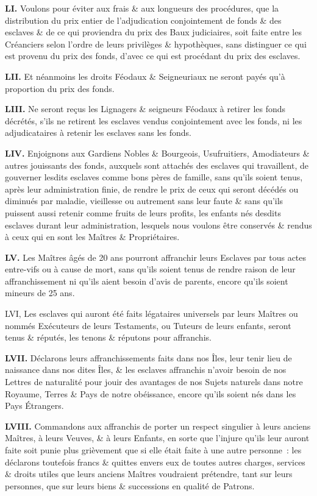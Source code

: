\documentclass[french,twoside]{book} %
\newcommand{\labelchar}[1]{\textbf{\color{rubric} #1}}
\begin{document}
\labelchar{LI.} Voulons pour éviter aux frais \& aux longueurs des procédures, que la distribution du prix entier de l’adjudication conjointement de fonds \& des esclaves \& de ce qui proviendra du prix des Baux judiciaires, soit faite entre les Créanciers selon l’ordre de leurs privilèges \& hypothèques, sans distinguer ce qui est provenu du prix des fonds, d’avec ce qui est procédant du prix des esclaves.\par
\labelchar{LII.} Et néanmoins les droits Féodaux \& Seigneuriaux ne seront payés qu’à proportion du prix des fonds.\par
\labelchar{LIII.} Ne seront reçus les Lignagers \& seigneurs Féodaux à retirer les fonds décrétés, s’ils ne retirent les esclaves vendus conjointement avec les fonds, ni les adjudicataires à retenir les esclaves sans les fonds.\par
\labelchar{LIV.} Enjoignons aux Gardiens Nobles \& Bourgeois, Usufruitiers, Amodiateurs \& autres jouissants des fonds, auxquels sont attachés des esclaves qui travaillent, de gouverner lesdits esclaves comme bons pères de famille, sans qu’ils soient tenus, après leur administration finie, de rendre le prix de ceux qui seront décédés ou diminués par maladie, vieillesse ou autrement sans leur faute \& sans qu’ils puissent aussi retenir comme fruits de leurs profits, les enfants nés desdits esclaves durant leur administration, lesquels nous voulons être conservés \& rendus à ceux qui en sont les Maîtres \& Propriétaires.\par
\labelchar{LV.} Les Maîtres âgés de 20 ans pourront affranchir leurs Esclaves par tous actes entre-vifs ou à cause de mort, sans qu’ils soient tenus de rendre raison de leur affranchissement ni qu’ils aient besoin d’avis de parents, encore qu’ils soient mineurs de 25 ans.\par
LVI, Les esclaves qui auront été faits légataires universels par leurs Maîtres ou nommés Exécuteurs de leurs Testaments, ou Tuteurs de leurs enfants, seront tenus \& réputés, les tenons \& réputons pour affranchis.\par
\labelchar{LVII.} Déclarons leurs affranchissements faits dans nos Îles, leur tenir lieu de naissance dans nos dites Îles, \& les esclaves affranchis n’avoir besoin de nos Lettres de naturalité pour jouir des avantages de nos Sujets naturels dans notre Royaume, Terres \& Pays de notre obéissance, encore qu’ils soient nés dans les Pays Étrangers.\par
\labelchar{LVIII.} Commandons aux affranchis de porter un respect singulier à leurs anciens Maîtres, à leurs Veuves, \& à leurs Enfants, en sorte que l’injure qu’ils leur auront faite soit punie plus grièvement que si elle était faite à une autre personne : les déclarons toutefois francs \& quittes envers eux de toutes autres charges, services \& droits utiles que leurs anciens Maîtres voudraient prétendre, tant sur leurs personnes, que sur leurs biens \& successions en qualité de Patrons.\par
\end{document}
